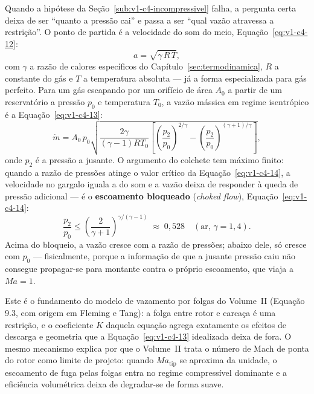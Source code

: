 \documentclass[12pt,a4paper]{article}
\numberwithin{equation}{section}
\numberwithin{table}{section}
\numberwithin{figure}{section}
\begin{document}
Quando a hipótese da Seção~\ref{sub:v1-c4-incompressivel} falha, a pergunta
certa deixa de ser ``quanto a pressão cai'' e passa a ser ``qual vazão
atravessa a restrição''. O ponto de partida é a velocidade do som do meio,
Equação~\eqref{eq:v1-c4-12}:
\begin{equation}\label{eq:v1-c4-12}
a = \sqrt{\gamma\, R\, T},
\end{equation}
com $\gamma$ a razão de calores específicos do
Capítulo~\ref{sec:termodinamica}, $R$ a constante do gás e $T$ a temperatura
absoluta --- já a forma especializada para gás perfeito. Para um gás
escapando por um orifício de área $A_0$ a partir de um reservatório a
pressão $p_0$ e temperatura $T_0$, a vazão mássica em regime isentrópico é a
Equação~\eqref{eq:v1-c4-13}:
\begin{equation}\label{eq:v1-c4-13}
\dot{m} = A_0\,p_0\sqrt{\frac{2\gamma}{(\gamma-1)R T_0}\left[
\left(\frac{p_2}{p_0}\right)^{2/\gamma} -
\left(\frac{p_2}{p_0}\right)^{(\gamma+1)/\gamma}\right]},
\end{equation}
onde $p_2$ é a pressão a jusante. O argumento do colchete tem máximo finito:
quando a razão de pressões atinge o valor crítico da
Equação~\eqref{eq:v1-c4-14}, a velocidade no gargalo iguala a do som e a
vazão deixa de responder à queda de pressão adicional --- é o
\textbf{escoamento bloqueado} (\textit{choked flow}), Equação~\eqref{eq:v1-c4-14}:
\begin{equation}\label{eq:v1-c4-14}
\frac{p_2}{p_0} \le \left(\frac{2}{\gamma+1}\right)^{\gamma/(\gamma-1)}
\;\approx\; 0{,}528 \quad (\text{ar, } \gamma = 1{,}4).
\end{equation}
Acima do bloqueio, a vazão cresce com a razão de pressões; abaixo dele, só
cresce com $p_0$ --- fisicalmente, porque a informação de que a jusante
pressão caiu não consegue propagar-se para montante contra o próprio
escoamento, que viaja a $Ma = 1$.

Este é o fundamento do modelo de vazamento por folgas do Volume~II
(Equação 9.3, com origem em Fleming e Tang): a folga entre rotor e carcaça é
uma restrição, e o coeficiente $K$ daquela equação agrega exatamente os
efeitos de descarga e geometria que a Equação~\eqref{eq:v1-c4-13} idealizada
deixa de fora. O mesmo mecanismo explica por que o Volume~II trata o número
de Mach de ponta do rotor como limite de projeto: quando $Ma_{\text{tip}}$ se
aproxima da unidade, o escoamento de fuga pelas folgas entra no regime
compressível dominante e a eficiência volumétrica deixa de degradar-se de
forma suave.
\end{document}
